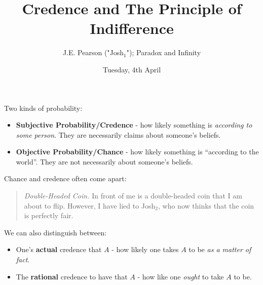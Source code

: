 \documentclass{tufte-handout}
\title{Credence and The Principle of Indifference %
}
\author[]{J.E. Pearson ("Josh$_1$"); Paradox and Infinity}
\date{Tuesday, 4th April}  %
\begin{document}
\maketitle

Two kinds of probability:
\begin{itemize}
    \item \textbf{Subjective Probability/Credence} 
        - how likely something is \textit{according to some person}. They are necessarily claims about someone's beliefs.
    \item \textbf{Objective Probability/Chance} %
       - how likely something is “according to the world”. They are not necessarily about someone's beliefs. 
\end{itemize}

\noindent Chance and credence often come apart:

\begin{quote}

    \textit{Double-Headed Coin.}  In front of me is a double-headed coin that I am about to flip. However, I have lied to Josh$_2$, who now thinks that the coin is perfectly fair.
\end{quote}


\noindent We can also distinguish between:

\begin{itemize}
    \item One's \textbf{actual} credence that $A$ - how likely one takes $A$ to be \textit{as a matter of fact}.

    \item The \textbf{rational} credence to have that $A$ - how like one \textit{ought} to take $A$ to be.
\end{itemize}
\end{document}
